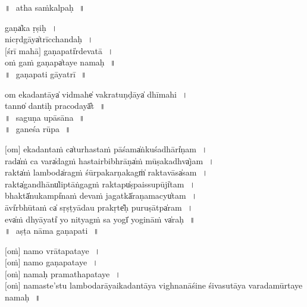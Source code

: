 \documentclass[parskip, DIV=14]{scrartcl}
\begin{document}
\vspace{1cm}
॥\,~a॒tha saṁkalpa॒ḥ\,~॥ \\
\vspace{0.5cm}

gaṇa̍ka ṛ॒ṣiḥ\,~।\\ nicṛdgāya̍trīccha॒ndaḥ\,~।\\ 
$[$śrī mahā$]$ gaṇapati̍rdeva॒tā\,~।\\
oṁ gaṁ ga॒ṇapa̍taye namaḥ\,~॥\\

\vspace{1cm}
॥\,~gaṇapati gāyatrī\,~॥ \\

\vspace{0.4cm}

om ekada॒ntāya̍ vi॒dmahe̍ vakratu॒ṇḍāya̍ dhīmahi\,~।\\ tanno̍ dantiḥ praco॒dayā̎t\,~॥\\

\vspace{1cm}
॥\,~saguṇa upāsāna\,~॥ \\
\vspace{0.5cm}
॥\,~ganeśa rūpa\,~॥ \\
\vspace{0.5cm}

$[$om$]$ ekada॒ntaṁ ca̍turha॒sta॒ṁ pā॒śama̍ṅkuśa॒dhāri̍ṇam\,~।\\ rada̍ṁ ca॒ vara̍dagṁ ha॒stai॒rbibhrāṇa̍ṁ mūṣa॒kadhva̍jam\,~।\\ rakta̍ṁ la॒mboda̍ragṁ śū॒rpa॒ka॒rṇakagṁ̍ rakta॒vāsa̍sam\,~।\\ rakta̍ga॒ndhānu̍liptā॒ṅga॒gṁ॒ ra॒ktapu̍ṣpaissu॒pūji̍tam\,~।\\ bhaktā̍nu॒kampi̍naṁ de॒va॒ṁ ja॒gatkā̍raṇa॒macyu̍tam\,~।\\ āvi̍rbhū॒taṁ ca̍ sṛ॒ṣṭyā॒dau॒ pra॒kṛte̎ḥ puru॒ṣātpa̍ram\,~।\\
eva̍ṁ dhyā॒yati̍ yo ni॒tya॒gṁ॒ sa॒ yogī̍ yogi॒nāṁ va̍raḥ\,~॥\\

\vspace{1cm}
॥\,~aṣṭa nāma gaṇapati\,~॥ \\
\vspace{0.4cm}

$[$oṁ$]$ namo vrātapataye\,~।\\
$[$oṁ$]$ namo gaṇapataye\,~।\\
$[$oṁ$]$ namaḥ pramathapataye\,~।\\
$[$oṁ$]$ namaste’stu lambodarāyaikadantāya vighnanāśine śivasutāya varadamūrtaye॒ namaḥ\,~॥\\
\end{document}
